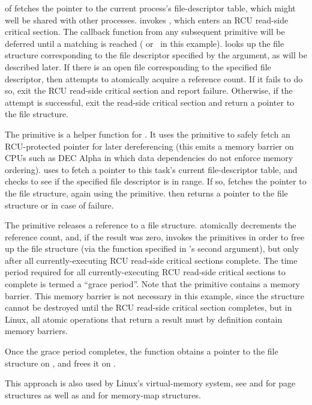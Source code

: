 \begin{fcvref}
 of  fetches the pointer to the current
process's file-descriptor table, which might well be shared
with other processes.
 invokes , which
enters an RCU read-side critical section.
The callback function from any subsequent  primitive
will be deferred until a matching  is reached
( or~ in this example).
 looks up the file structure corresponding to the file
descriptor specified by the  argument, as will be
described later.
If there is an open file corresponding to the specified file descriptor,
then  attempts to atomically acquire a reference count.
If it fails to do so,  exit the RCU read-side critical
section and report failure.
Otherwise, if the attempt is successful, 
exit the read-side
critical section and return a pointer to the file structure.

The  primitive is a helper function for
.
It uses the  primitive to safely fetch an
RCU-protected pointer for later dereferencing (this emits a
memory barrier on CPUs such as DEC Alpha in which data dependencies
do not enforce memory ordering).
 uses  to fetch a pointer to this
task's current file-descriptor table,
and  checks to see if the specified file descriptor is in range.
If so,  fetches the pointer to the file structure, again using
the  primitive.
 then returns a pointer to the file structure or 
in case of failure.

The  primitive releases a reference to a file structure.
 atomically decrements the reference count, and, if the result
was zero,  invokes the  primitives in order to
free up the file structure (via the  function
specified in 's second argument),
but only after all currently-executing
RCU read-side critical sections complete.
The time period required for all currently-executing RCU read-side
critical sections to complete is termed a ``grace period''.
Note that the  primitive contains
a memory barrier.
This memory barrier is not necessary in this example, since the structure
cannot be destroyed until the RCU read-side critical section completes,
but in Linux, all atomic operations that return a result must
by definition contain memory barriers.

Once the grace period completes, the  function
obtains a pointer to the file structure on , and frees it
on .

This approach is also used by Linux's virtual-memory system,
see  and  for
page structures as well as  and 
for memory-map structures.
\end{fcvref}

